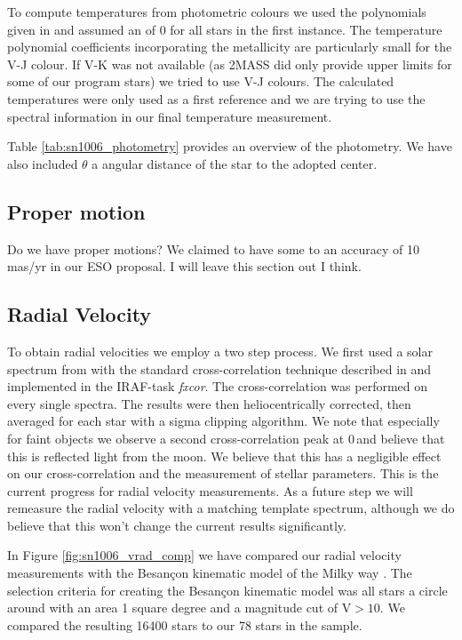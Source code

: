 To compute temperatures from photometric colours we used the polynomials given in  \citep{2010A&A...512A..54C} and assumed an \feh of 0 for all stars in the first instance. The temperature polynomial coefficients incorporating the metallicity are particularly small for the V-J colour. If V-K was not available (as 2MASS did only provide upper limits for some of our program stars) we tried to use V-J colours. The calculated temperatures were only used as a first reference and we are trying to use the spectral information in our final temperature measurement.

Table \ref{tab:sn1006_photometry} provides an overview of the photometry. We have also included $\theta$ a angular distance of the star to the adopted center.




\subsection{Proper motion}
Do we have proper motions? We claimed to have some to an accuracy of 10 mas/yr in our ESO proposal. I will leave this section out I think. 

\subsection{Radial Velocity}

To obtain radial velocities we employ a two step process. We first used a solar spectrum from \citep{1984sfat.book.....K} with the standard cross-correlation technique described in \citep{1979AJ.....84.1511T} and implemented in the IRAF-task \textit{fxcor}. The cross-correlation was performed on every single spectra. The results were then heliocentrically corrected, then averaged for each star with a sigma clipping algorithm. We note that especially for faint objects we observe a second cross-correlation peak at 0\,\kms and believe that this is reflected light from the moon. We believe that this has a negligible effect on our cross-correlation and the measurement of stellar parameters. This is the current progress for radial velocity measurements. As a future step we will remeasure the radial velocity with a matching template spectrum, although we do believe that this won't change the current results significantly.

In Figure \ref{fig:sn1006_vrad_comp} we have compared our radial velocity measurements with the Besan\c{c}on kinematic model of the Milky way \citep{2003A&A...409..523R}. The selection criteria for creating the  Besan\c{c}on kinematic model was all stars a circle around  with an area 1 square degree and a magnitude cut of $\textrm{V}>10$. We compared the resulting 16400 stars to our 78 stars in the sample. 


